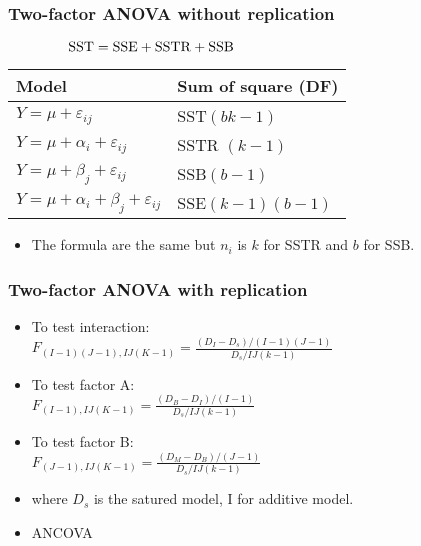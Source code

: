\documentclass[10pt, french]{article}
\begin{document}
\begin{multicols*}{3}
\subsubsection*{Two-factor ANOVA without replication}
$\hspace*{1.5cm} \mathrm{SST} = \mathrm{SSE} + \mathrm{SSTR} + \mathrm{SSB}$
   \begin{center}
      \begin{tabular}{ll}
        \hline
        Model & Sum of square (DF) \\
        \hline
         $Y = \mu + \varepsilon_{ij}$ & SST$(bk-1)$  \\
         $Y = \mu + \alpha_i + \varepsilon_{ij}$ & SSTR $(k-1)$ \\
         $Y = \mu + \beta_j + \varepsilon_{ij}$ &SSB$(b-1)$ \\
         $Y = \mu +\alpha_i +  \beta_j + \varepsilon_{ij}$ & SSE$(k-1)(b-1)$  \\
         \hline
      \end{tabular}
   \end{center}
\begin{itemize}[align=left,leftmargin=*]
  \item The formula are the same but $n_i$ is $k$ for SSTR and $b$ for SSB.
\end{itemize}
\subsubsection*{Two-factor ANOVA with replication}
\begin{itemize}[align=left,leftmargin=*]
   \item To test interaction:\\
   $F_{(I-1)(J-1),IJ(K-1)} = \frac{(D_I - D_s)/(I-1)(J-1)}{D_s/IJ(k-1)}$
   \item To test factor A:\\
   $F_{(I-1),IJ(K-1)} = \frac{(D_B - D_I)/(I-1)}{D_s/IJ(k-1)}$
   \item To test factor B: \\
   $F_{(J-1),IJ(K-1)} = \frac{(D_M - D_B)/(J-1)}{D_s/IJ(k-1)}$
   \item[] where $D_s$ is the satured model, I for additive model.
   \item ANCOVA
\end{itemize}



\end{multicols*}
\end{document}
